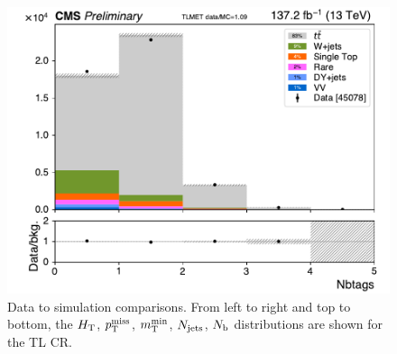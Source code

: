 \begin{figure}[!htb]
\includegraphics[width=0.45\linewidth]{figs/ssan/cr/run2_tlmet_nbtags_in.pdf}
\caption{ Data to simulation comparisons. From left to right  and top to bottom,
the $H_{\mathrm{T}}$, $p_{\mathrm{T}}^\text{miss}$, $m_{\mathrm{T}}^{\text{min}}$, $N_\text{jets}$, $N_\mathrm{b}$ distributions are
shown for the TL CR.}
\label{fig:TLBaselineMET}
\end{figure}



